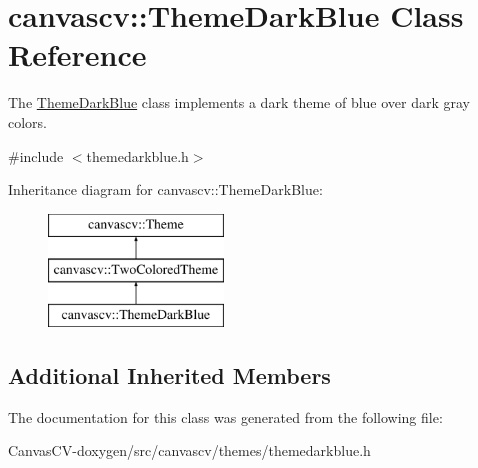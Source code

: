 \hypertarget{classcanvascv_1_1ThemeDarkBlue}{}\section{canvascv\+:\+:Theme\+Dark\+Blue Class Reference}
\label{classcanvascv_1_1ThemeDarkBlue}


The \hyperlink{classcanvascv_1_1ThemeDarkBlue}{Theme\+Dark\+Blue} class implements a dark theme of blue over dark gray colors.  




{\ttfamily \#include $<$themedarkblue.\+h$>$}

Inheritance diagram for canvascv\+:\+:Theme\+Dark\+Blue\+:\begin{figure}[H]
\begin{center}
\leavevmode
\includegraphics[height=3.000000cm]{classcanvascv_1_1ThemeDarkBlue}
\end{center}
\end{figure}
\subsection*{Additional Inherited Members}


The documentation for this class was generated from the following file\+:\begin{DoxyCompactItemize}
\item 
Canvas\+C\+V-\/doxygen/src/canvascv/themes/themedarkblue.\+h\end{DoxyCompactItemize}
